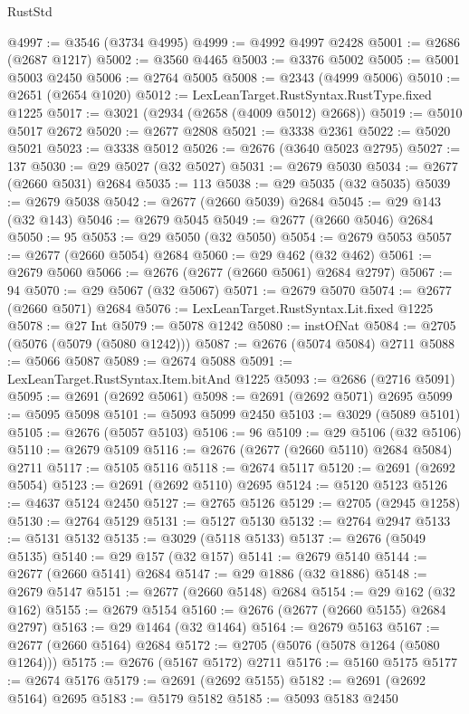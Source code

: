 \begin{lexlean}{RustStd}
\begin{coremodule}
@4997 := @3546 (@3734 @4995)
@4999 := @4992 @4997 @2428
@5001 := @2686 (@2687 @1217)
@5002 := @3560 @4465
@5003 := @3376 @5002
@5005 := @5001 @5003 @2450
@5006 := @2764 @5005
@5008 := @2343 (@4999 @5006)
@5010 := @2651 (@2654 @1020)
@5012 := LexLeanTarget.RustSyntax.RustType.fixed @1225
@5017 := @3021 (@2934 (@2658 (@4009 @5012) @2668))
@5019 := @5010 @5017 @2672
@5020 := @2677 @2808
@5021 := @3338 @2361
@5022 := @5020 @5021
@5023 := @3338 @5012
@5026 := @2676 (@3640 @5023 @2795)
@5027 := 137
@5030 := @29 @5027 (@32 @5027)
@5031 := @2679 @5030
@5034 := @2677 (@2660 @5031) @2684
@5035 := 113
@5038 := @29 @5035 (@32 @5035)
@5039 := @2679 @5038
@5042 := @2677 (@2660 @5039) @2684
@5045 := @29 @143 (@32 @143)
@5046 := @2679 @5045
@5049 := @2677 (@2660 @5046) @2684
@5050 := 95
@5053 := @29 @5050 (@32 @5050)
@5054 := @2679 @5053
@5057 := @2677 (@2660 @5054) @2684
@5060 := @29 @462 (@32 @462)
@5061 := @2679 @5060
@5066 := @2676 (@2677 (@2660 @5061) @2684 @2797)
@5067 := 94
@5070 := @29 @5067 (@32 @5067)
@5071 := @2679 @5070
@5074 := @2677 (@2660 @5071) @2684
@5076 := LexLeanTarget.RustSyntax.Lit.fixed @1225
@5078 := @27 Int
@5079 := @5078 @1242
@5080 := instOfNat
@5084 := @2705 (@5076 (@5079 (@5080 @1242)))
@5087 := @2676 (@5074 @5084) @2711
@5088 := @5066 @5087
@5089 := @2674 @5088
@5091 := LexLeanTarget.RustSyntax.Item.bitAnd @1225
@5093 := @2686 (@2716 @5091)
@5095 := @2691 (@2692 @5061)
@5098 := @2691 (@2692 @5071) @2695
@5099 := @5095 @5098
@5101 := @5093 @5099 @2450
@5103 := @3029 (@5089 @5101)
@5105 := @2676 (@5057 @5103)
@5106 := 96
@5109 := @29 @5106 (@32 @5106)
@5110 := @2679 @5109
@5116 := @2676 (@2677 (@2660 @5110) @2684 @5084) @2711
@5117 := @5105 @5116
@5118 := @2674 @5117
@5120 := @2691 (@2692 @5054)
@5123 := @2691 (@2692 @5110) @2695
@5124 := @5120 @5123
@5126 := @4637 @5124 @2450
@5127 := @2765 @5126
@5129 := @2705 (@2945 @1258)
@5130 := @2764 @5129
@5131 := @5127 @5130
@5132 := @2764 @2947
@5133 := @5131 @5132
@5135 := @3029 (@5118 @5133)
@5137 := @2676 (@5049 @5135)
@5140 := @29 @157 (@32 @157)
@5141 := @2679 @5140
@5144 := @2677 (@2660 @5141) @2684
@5147 := @29 @1886 (@32 @1886)
@5148 := @2679 @5147
@5151 := @2677 (@2660 @5148) @2684
@5154 := @29 @162 (@32 @162)
@5155 := @2679 @5154
@5160 := @2676 (@2677 (@2660 @5155) @2684 @2797)
@5163 := @29 @1464 (@32 @1464)
@5164 := @2679 @5163
@5167 := @2677 (@2660 @5164) @2684
@5172 := @2705 (@5076 (@5078 @1264 (@5080 @1264)))
@5175 := @2676 (@5167 @5172) @2711
@5176 := @5160 @5175
@5177 := @2674 @5176
@5179 := @2691 (@2692 @5155)
@5182 := @2691 (@2692 @5164) @2695
@5183 := @5179 @5182
@5185 := @5093 @5183 @2450

\end{coremodule}
\end{lexlean}
